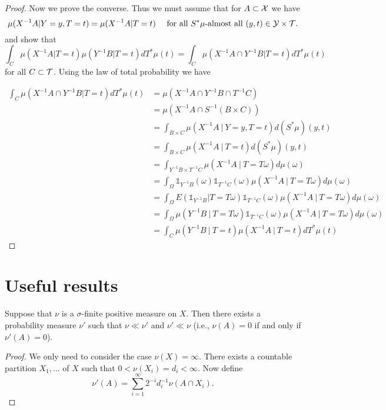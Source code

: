 \documentclass[twoside, a4paper, 10pt]{amsart}
\begin{document}
\begin{eg}
\begin{proof}
Now we prove the converse. Thus we must assume that for $A \subset \mathcal{X}$ we have $$\mu(X^{-1}A | Y=y, T=t) = \mu(X^{-1}A|T=t) \quad \text{ for all $S^*\mu$-almost all $(y,t) \in \mathcal{Y} \times \mathcal{T}$.}$$ and show that $$\int_{C} \mu(X^{-1}A | T=t)\mu(Y^{-1}B | T=t) dT^*\mu(t) = \int_{C} \mu(X^{-1}A \cap Y^{-1}B | T=t) dT^*\mu(t)$$ for all $C \subset \mathcal{T}$. Using the law of total probability we have

\begin{align*} \int_{C} \mu(X^{-1}A \cap Y^{-1}B | T=t) dT^*\mu(t) &= \mu(X^{-1}A \cap Y^{-1}B \cap T^{-1}C) \\ 
&=\mu(X^{-1}A \cap S^{-1}(B \times C))  \\
&= \int_{B \times C} \mu(X^{-1}A~|~ Y=y, T=t) d(S^*\mu)(y,t) \\ 
&= \int_{B \times C} \mu(X^{-1}A~|~ T=t) d(S^*\mu)(y,t) \\ 
&= \int_{Y^{-1}B \times T^{-1}C} \mu(X^{-1}A~|~ T=T\omega) d\mu(\omega) \\
&= \int_{\Omega} \mathds{1}_{Y^{-1}B}(\omega) \mathds{1}_{T^{-1}C}(\omega) \mu(X^{-1}A~|~ T=T\omega) d\mu(\omega) \\
&=\int_{\Omega} E(\mathds{1}_{Y^{-1}B}|T=T\omega) \mathds{1}_{T^{-1}C}(\omega) \mu(X^{-1}A~|~ T=T\omega) d\mu(\omega) \\ 
&= \int_{\Omega} \mu(Y^{-1}B ~|~ T=T\omega) \mathds{1}_{T^{-1}C}(\omega) \mu(X^{-1}A~|~ T=T\omega) d\mu(\omega) \\ 
&= \int_{C} \mu(Y^{-1}B~|~ T=t) \mu(X^{-1}A ~|~ T=t) dT^*\mu(t) \end{align*}

\end{proof}

\end{eg}

\section{Useful results}

\begin{lemma} Suppose that $\nu$ is a $\sigma$-finite positive measure on $X$. Then there exists a probability measure $\nu'$ such that $\nu \ll \nu'$ and $\nu' \ll \nu$ (i.e., $\nu(A) = 0$ if and only if $\nu'(A) = 0$).

\end{lemma}

\begin{proof} We only need to consider the case $\nu(X) = \infty$. There exists a countable partition $X_1, \ldots$ of $X$ such that $0< \nu(X_i) = d_i < \infty$. Now define $$\nu'(A) = \sum_{i=1}^{\infty} 2^{-i}d_i^{-1} \nu(A \cap X_i).$$

\end{proof}
\end{document}
